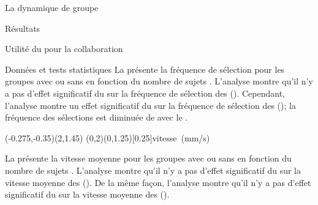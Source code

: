 \documentclass[myfrancais,ngerman,english,french]{mythesis}
\begin{document}
\begin{mychapter}{La dynamique de groupe}
\begin{mysection}{Résultats}
\begin{mysubsection}{Utilité du \mybrainstorming pour la collaboration}
\begin{mysubsubsection}{Données et tests statistiques}
					La  présente la fréquence de sélection  pour les groupes avec ou sans \mybrainstorming {} en fonction du nombre de sujets .
					L'analyse montre qu'il n'y a pas d'effet significatif du \mybrainstorming {} sur la fréquence de sélection  des  ().
					Cependant, l'analyse montre un effet significatif du \mybrainstorming {} sur la fréquence de sélection  des  (); la fréquence des sélections est diminuée de  avec le \mybrainstorming.

					\begin{myfigure}
						\begin{myps}(-0.275,-0.35)(2,1.45)
							\myaxes(0,2){\mybrainstorming}(0,1.25)[0.25]{vitesse~(mm/s)}
						\end{myps}
					\end{myfigure}

					La  présente la vitesse moyenne  pour les groupes avec ou sans \mybrainstorming {} en fonction du nombre de sujets .
					L'analyse montre qu'il n'y a pas d'effet significatif du \mybrainstorming {} sur la vitesse moyenne  des  ().
					De la même façon, l'analyse montre qu'il n'y a pas d'effet significatif du \mybrainstorming {} sur la vitesse moyenne  des  ().


\end{mysubsubsection}
\end{mysubsection}
\end{mysection}
\end{mychapter}
\end{document}
